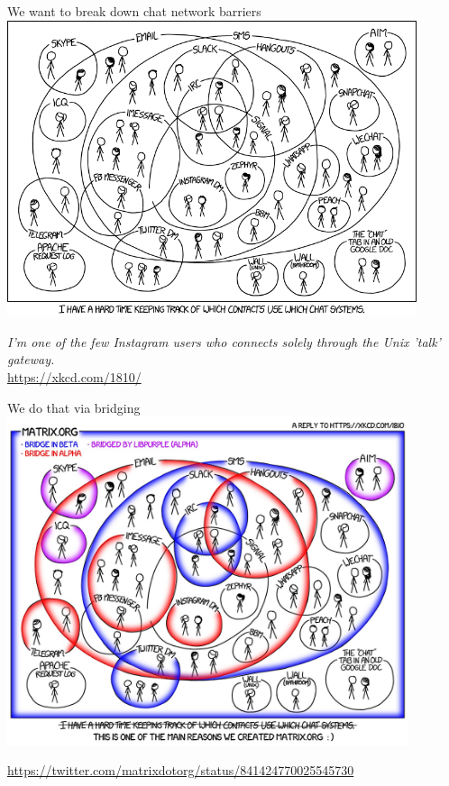 \documentclass{acm}
\begin{document}
\begin{frame}{We want to break down chat network barriers}
    \centering
    \includegraphics[width=0.9\textwidth]{graphics/chat_systems.png}

    \scriptsize
    \textit{I'm one of the few Instagram users who connects solely through the
    Unix 'talk' gateway.}\\
    \tiny
    \url{https://xkcd.com/1810/}
\end{frame}

\begin{frame}{We do that via bridging}
    \centering
    \includegraphics[width=0.88\textwidth]{graphics/matrix_bridging}

    \tiny
    \url{https://twitter.com/matrixdotorg/status/841424770025545730}
\end{frame}
\end{document}
